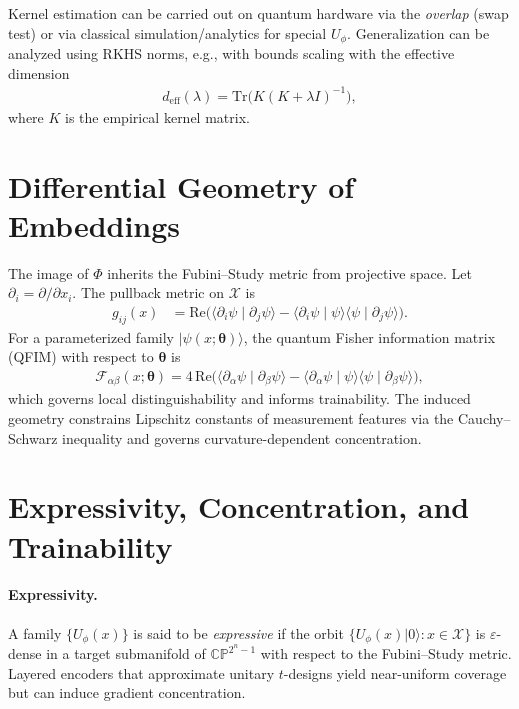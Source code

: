 \documentclass[11pt]{article}
\begin{document}
Kernel estimation can be carried out on quantum hardware via the \emph{overlap} (swap test) or via classical simulation/analytics for special \(U_\phi\). Generalization can be analyzed using RKHS norms, e.g., with bounds scaling with the effective dimension
\begin{align}
  d_\mathrm{eff}(\lambda) 
  = \mathrm{Tr}\big( K(K+\lambda I)^{-1} \big),
\end{align}
where \(K\) is the empirical kernel matrix.

\section{Differential Geometry of Embeddings}

The image of \(\Phi\) inherits the Fubini--Study metric from projective space. Let \(\partial_i = \partial/\partial x_i\). The pullback metric on \(\mathcal{X}\) is
\begin{align}
  g_{ij}(x) 
  &= \mathrm{Re}\Big( \langle \partial_i \psi \mid \partial_j \psi \rangle 
      - \langle \partial_i \psi \mid \psi \rangle \langle \psi \mid \partial_j \psi \rangle \Big).\label{eq:fs}
\end{align}
For a parameterized family \(\lvert \psi(x;\bm{\theta})\rangle\), the quantum Fisher information matrix (QFIM) with respect to \(\bm{\theta}\) is
\begin{align}
  \mathcal{F}_{\alpha\beta}(x;\bm{\theta})
  = 4\,\mathrm{Re}\Big( \langle \partial_\alpha \psi \mid \partial_\beta \psi \rangle 
      - \langle \partial_\alpha \psi \mid \psi \rangle \langle \psi \mid \partial_\beta \psi \rangle \Big),
\end{align}
which governs local distinguishability and informs trainability. The induced geometry constrains Lipschitz constants of measurement features via the Cauchy--Schwarz inequality and governs curvature-dependent concentration.

\section{Expressivity, Concentration, and Trainability}

\paragraph{Expressivity.} A family \(\{U_\phi(x)\}\) is said to be \emph{expressive} if the orbit \(\{ U_\phi(x) \lvert 0 \rangle \colon x\in\mathcal{X}\}\) is \(\varepsilon\)-dense in a target submanifold of \(\mathbb{CP}^{2^n-1}\) with respect to the Fubini--Study metric. Layered encoders that approximate unitary \(t\)-designs yield near-uniform coverage but can induce gradient concentration.
\end{document}

